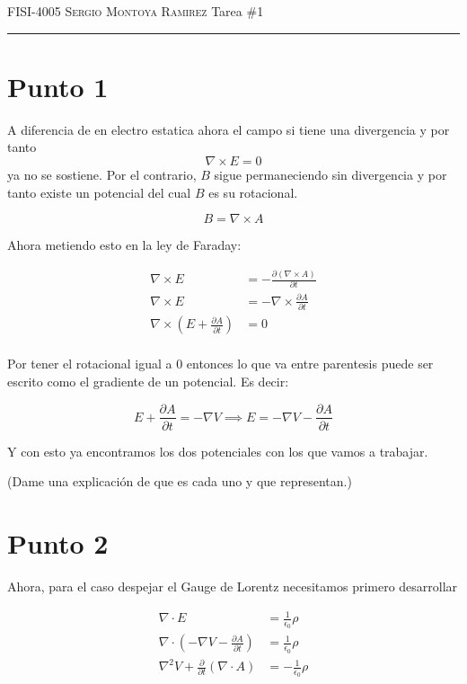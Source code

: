 \documentclass[12pt]{amsart}
\begin{document}
  \thispagestyle{empty}

  {\scshape FISI-4005} \hfill {\scshape \large Sergio Montoya Ramirez} \hfill {Tarea \#1\scshape }

  \smallskip

  \hrule
  \section{Punto 1}

  A diferencia de en electro estatica ahora el campo si tiene una divergencia y por tanto $$\nabla \times E = 0$$ ya no se sostiene. Por el contrario, $B$ sigue permaneciendo sin divergencia y por tanto existe un potencial del cual $B$ es su rotacional.

    $$B = \nabla \times A$$

  Ahora metiendo esto en la ley de Faraday:

  \begin{align*}
    \nabla \times E &= - \frac{\partial (\nabla \times A)}{\partial t}\\
    \nabla \times E &= - \nabla \times \frac{\partial A}{\partial t}\\
    \nabla \times \left(E + \frac{\partial A}{\partial t}\right) &= 0\\
  \end{align*}

  Por tener el rotacional igual a 0 entonces lo que va entre parentesis puede ser escrito como el gradiente de un potencial. Es decir:

  $$E + \frac{\partial A}{\partial t} = - \nabla V \implies E = - \nabla V - \frac{\partial A}{\partial t}$$

  Y con esto ya encontramos los dos potenciales con los que vamos a trabajar. 

  (Dame una explicación de que es cada uno y que representan.)

  \section{Punto 2}

  Ahora, para el caso despejar el Gauge de Lorentz necesitamos primero desarrollar

  \begin{align*}
    \nabla \cdot E &= \frac{1}{\epsilon_0}\rho\\
    \nabla \cdot \left(- \nabla V - \frac{\partial A}{\partial t}\right) &= \frac{1}{\epsilon_0}\rho\\
    \nabla^2 V + \frac{\partial}{\partial t}(\nabla \cdot A) &= - \frac{1}{\epsilon_0}\rho\\
  \end{align*}
\end{document}
